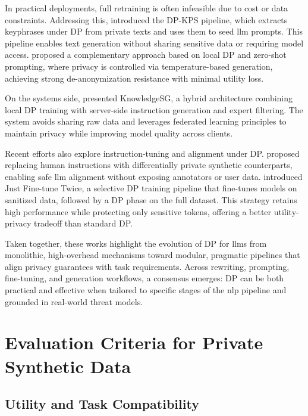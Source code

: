In practical deployments, full retraining is often infeasible due to cost or data constraints. Addressing this, \citet{nageshPrivateTextGeneration2025} introduced the DP-KPS pipeline, which extracts keyphrases under DP from private texts and uses them to seed \gls{llm} prompts. This pipeline enables text generation without sharing sensitive data or requiring model access. \citet{utpalaLocallyDifferentiallyPrivate2023} proposed a complementary approach based on local DP and zero-shot prompting, where privacy is controlled via temperature-based generation, achieving strong de-anonymization resistance with minimal utility loss.

On the systems side, \citet{wangKnowledgeSGPrivacyPreservingSynthetic2024} presented KnowledgeSG, a hybrid architecture combining local DP training with server-side instruction generation and expert filtering. The system avoids sharing raw data and leverages federated learning principles to maintain privacy while improving model quality across clients.

Recent efforts also explore instruction-tuning and alignment under DP. \citet{yu2024privacy} proposed replacing human instructions with differentially private synthetic counterparts, enabling safe \gls{llm} alignment without exposing annotators or user data. \citet{shi-etal-2022-just} introduced Just Fine-tune Twice, a selective DP training pipeline that fine-tunes models on sanitized data, followed by a DP phase on the full dataset. This strategy retains high performance while protecting only sensitive tokens, offering a better utility-privacy tradeoff than standard DP.

Taken together, these works highlight the evolution of DP for \glspl{llm} from monolithic, high-overhead mechanisms toward modular, pragmatic pipelines that align privacy guarantees with task requirements. Across rewriting, prompting, fine-tuning, and generation workflows, a consensus emerges: DP can be both practical and effective when tailored to specific stages of the \gls{nlp} pipeline and grounded in real-world threat models.

\section{Evaluation Criteria for Private Synthetic Data}
\subsection{Utility and Task Compatibility}

